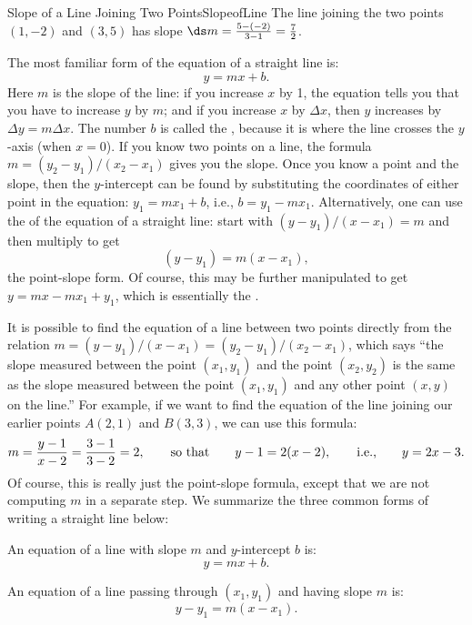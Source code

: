 \bigskip

\begin{example}{Slope of a Line Joining Two Points}{SlopeofLine}
The line joining the two points $(1,-2)$ and $(3,5)$ has slope
$\ds m=\frac{5-(-2)}{3-1}=\frac{7}{2}$.
\end{example}

The most familiar form of the equation of a straight line is:
$$y=mx+b.$$
Here $m$ is the slope of the line: if you increase $x$ by
1, the equation tells you that you have to increase $y$ by $m$; and if
you increase $x$ by $\Delta x$, then $y$ increases by $\Delta
y=m\Delta x$.  The number $b$ is called the , because
it is where the line crosses the $y$-axis (when $x=0$).  If you know two points on
a line, the formula $m=(y_2-y_1)/(x_2-x_1)$ gives you the slope.
Once you know a point and the slope, then the $y$-intercept can be
found by substituting the coordinates of either point in the equation:
$y_1=mx_1+b$, i.e., $b=y_1-mx_1$.  Alternatively, one can use the
 of the equation of a straight line: start with
$(y-y_1)/(x-x_1)=m$ and then multiply to get 
$$(y-y_1)=m(x-x_1),$$ the
point-slope form. Of course, this may be further manipulated to get
$y=mx-mx_1+y_1$, which is essentially the .

It is possible to find the equation of a line between two points directly
from the relation $m=(y-y_1)/(x-x_1)=(y_2-y_1)/(x_2-x_1)$, which says ``the
slope measured between the point $(x_1,y_1)$ and the point $(x_2,y_2)$ is
the same as the slope measured between the point $(x_1,y_1)$ and any other
point $(x,y)$ on the line.''  For example, if we want to find the equation
of the line joining our earlier points $A(2,1)$ and $B(3,3)$, we can use
this formula:
$$
m=\frac{y-1}{x-2}=\frac{3-1}{3-2}=2,\qquad\hbox{so~that}\qquad
y-1=2(x-2),\qquad\hbox{i.e.,}\qquad y=2x-3.
$$
Of course, this is really just the point-slope formula, except that we
are not computing $m$ in a separate step. 
We summarize the three common forms of writing a straight line below:\\

\begin{formulabox}
An equation of a line with slope $m$ and $y$-intercept $b$ is:
$$y=mx+b.$$
\end{formulabox}

\bigskip

\begin{formulabox}
An equation of a line passing through $(x_1,y_1)$ and having slope $m$ is:
$$y-y_1=m(x-x_1).$$
\end{formulabox}

